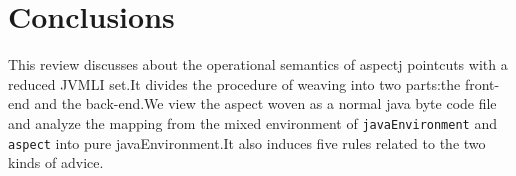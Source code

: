 \section{Conclusions}

This review discusses about the operational semantics of aspectj pointcuts with a reduced JVMLI set.It divides the procedure of weaving into two parts:the front-end and the back-end.We view the aspect woven as a normal java byte code file and analyze the mapping from the mixed environment of \texttt{javaEnvironment} and \texttt{aspect} into pure javaEnvironment.It also induces five rules related to the two kinds of advice.
